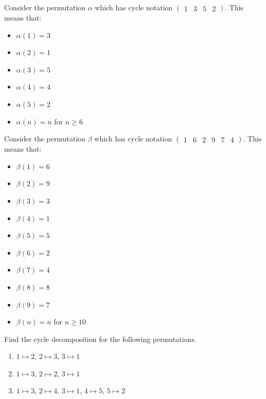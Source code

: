 \begin{example}
    Consider the permutation $\alpha$ which has cycle notation $\begin{pmatrix}1 & 3 & 5 & 2\end{pmatrix}$. This means that:
    \begin{multicols}{2}
        \begin{itemize}
            \item $\alpha(1) = 3$
            \item $\alpha(2) = 1$
            \item $\alpha(3) = 5$
            \item $\alpha(4) = 4$
            \item $\alpha(5) = 2$
            \item $\alpha(n) = n$ for $n \geq 6$
        \end{itemize}
    \end{multicols}
\end{example}

\newpage

\begin{example}
    Consider the permutation $\beta$ which has cycle notation $\begin{pmatrix}1 & 6 & 2 & 9 & 7 & 4\end{pmatrix}$. This means that:
    \begin{multicols}{2}
        \begin{itemize}
            \item $\beta(1) = 6$
            \item $\beta(2) = 9$
            \item $\beta(3) = 3$
            \item $\beta(4) = 1$
            \item $\beta(5) = 5$
            \item $\beta(6) = 2$
            \item $\beta(7) = 4$
            \item $\beta(8) = 8$
            \item $\beta(9) = 7$
            \item $\beta(n) = n$ for $n \geq 10$
        \end{itemize}
    \end{multicols}
\end{example}

\begin{exercise}
    Find the cycle decomposition for the following permutations.
    \begin{enumerate}[label=(\alph*)]
        \item $1 \mapsto 2$, $2 \mapsto 3$, $3 \mapsto 1$
        \item $1 \mapsto 3$, $2 \mapsto 2$, $3 \mapsto 1$
        \item $1 \mapsto 3$, $2 \mapsto 4$, $3 \mapsto 1$, $4 \mapsto 5$, $5 \mapsto 2$
    \end{enumerate}
\end{exercise}

